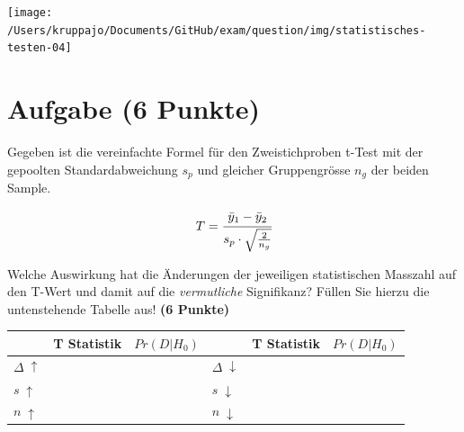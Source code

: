 \documentclass[a4paper, 10pt]{scrartcl}\usepackage[]{graphicx}\usepackage[]{xcolor}
\begin{document}
\begin{center}
  \texttt{[image: /Users/kruppajo/Documents/GitHub/exam/question/img/statistisches-testen-04]}
\end{center}


 
\clearpage

\section{Aufgabe \hfill (6 Punkte)}

Gegeben ist die vereinfachte Formel f{\"u}r den Zweistichproben t-Test mit der
gepoolten Standardabweichung $s_p$ und gleicher Gruppengr{\"o}sse $n_g$ der
beiden Sample.

\begin{equation*}
  \label{eq:1}
  T = \cfrac{\bar{y}_1 - \bar{y}_2}{s_p \cdot \sqrt{\tfrac{2}{n_g}}}
\end{equation*}

Welche Auswirkung hat die {\"A}nderungen der jeweiligen statistischen Masszahl
auf den T-Wert und damit auf die \textit{vermutliche} Signifikanz? F{\"u}llen
Sie hierzu die untenstehende Tabelle aus! \textbf{(6 Punkte)}

\begin{center}
  \Large
  \begin{tabular}[c]{l|l|l|l|l|l}
    & T Statistik & $Pr(D|H_0)$ & & T Statistik & $Pr(D|H_0)$ \strut\\ 
    \hline
    \textbf{$\Delta\; \uparrow$} & \hspace{2cm} & \hspace{2cm} & \textbf{
                                                          $\Delta\; \downarrow$} &
                                                                          \hspace{2cm} & \hspace{2cm}\strut\\
    \hline
        \textbf{$s\; \uparrow$} & \hspace{2cm} & \hspace{2cm} & \textbf{
                                                          $s\; \downarrow$} &
                                                                          \hspace{2cm}
                                                & \hspace{2cm}\strut\\
    \hline
        \textbf{$n\; \uparrow$} & \hspace{2cm} & \hspace{2cm} & \textbf{
                                                          $n\; \downarrow$} &
                                                                          \hspace{2cm}
                                                & \hspace{2cm}\strut\\
    \hline
  \end{tabular}
\end{center}
 
\end{document}
